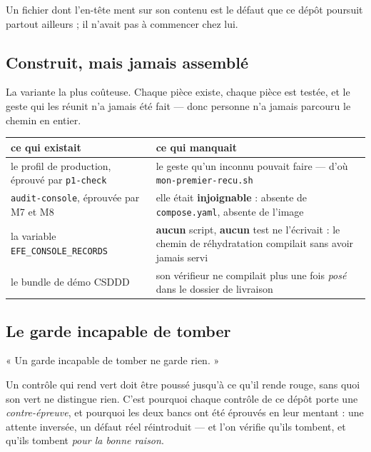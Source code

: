 \documentclass[10pt]{report}
\newcommand{\code}[1]{\texttt{\small #1}}
\begin{document}
\begin{these}
Un fichier dont l'en-tête ment sur son contenu est le défaut que ce dépôt poursuit partout ailleurs ;
il n'avait pas à commencer chez lui.
\end{these}

\subsection{Construit, mais jamais assemblé}

La variante la plus coûteuse. Chaque pièce existe, chaque pièce est testée, et le geste qui les
réunit n'a jamais été fait --- donc personne n'a jamais parcouru le chemin en entier.

\begin{longtable}{@{}p{6.4cm}p{8.6cm}@{}}
\toprule \textbf{ce qui existait} & \textbf{ce qui manquait} \\ \midrule \endhead
le profil de production, éprouvé par \code{p1-check} & le geste qu'un inconnu pouvait faire --- d'où \code{mon-premier-recu.sh} \\
\code{audit-console}, éprouvée par M7 et M8 & elle était \textbf{injoignable} : absente de \code{compose.yaml}, absente de l'image \\
la variable \code{EFE\_CONSOLE\_RECORDS} & \textbf{aucun} script, \textbf{aucun} test ne l'écrivait : le chemin de réhydratation compilait sans avoir jamais servi \\
le bundle de démo CSDDD & son vérifieur ne compilait plus une fois \emph{posé} dans le dossier de livraison \\
\bottomrule
\end{longtable}

\subsection{Le garde incapable de tomber}

\begin{these}
« Un garde incapable de tomber ne garde rien. »
\end{these}

Un contrôle qui rend vert doit être poussé jusqu'à ce qu'il rende rouge, sans quoi son vert ne
distingue rien. C'est pourquoi chaque contrôle de ce dépôt porte une \emph{contre-épreuve}, et
pourquoi les deux bancs ont été éprouvés en leur mentant : une attente inversée, un défaut réel
réintroduit --- et l'on vérifie qu'ils tombent, et qu'ils tombent \emph{pour la bonne raison}.
\end{document}
